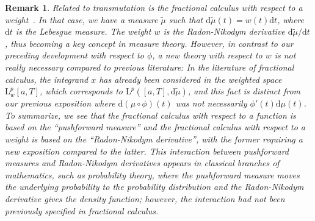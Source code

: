 \documentclass[12pt,reqno]{amsart}
\theoremstyle{plain}
\newtheorem{remark}[theorem]{Remark}
\numberwithin{equation}{section} %
\begin{document}
\begin{remark} \normalfont
Related to transmutation is the fractional calculus with respect to a weight~\cite{meu}. In that case, we have a measure $\tilde{\mu}$ such that $\mathrm{d}\tilde{\mu}(t)=w(t)\mathrm{d}t$, where $\mathrm{d}t$ is the Lebesgue measure. The weight $w$ is the Radon-Nikodym derivative $\mathrm{d}\tilde{\mu}/\mathrm{d}t$ \cite[Section~3.2]{boga}, thus becoming a key concept in measure theory. However, in contrast to our preceding development with respect to $\phi$, a new theory with respect to $w$ is not really necessary compared to previous literature: In the literature of fractional calculus, the integrand $x$ has already been considered in the weighted space $\mathrm{L}^p_w[a,T]$, which corresponds to $\mathrm{L}^p([a,T],\mathrm{d}\tilde{\mu})$, and this fact is distinct from our previous exposition where $\mathrm{d}(\mu\circ\phi)(t)$ was not necessarily $\phi'(t)\mathrm{d}\mu(t)$. To summarize, we see that the fractional calculus with respect to a function is based on the ``pushforward measure'' and the fractional calculus with respect to a weight is based on the ``Radon-Nikodym derivative'', with the former requiring a new exposition compared to the latter. This interaction between pushforward measures and Radon-Nikodym derivatives appears in classical branches of mathematics, such as probability theory, where the pushforward measure moves the underlying probability to the probability distribution and the Radon-Nikodym derivative gives the density function; however, the interaction had not been previously specified in fractional calculus.
\end{remark}
\end{document}
